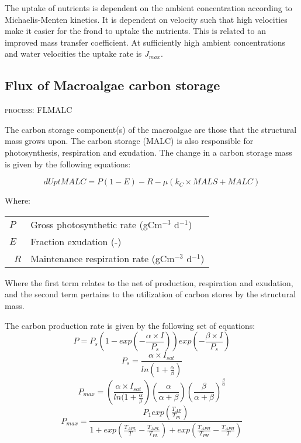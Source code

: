 \documentclass{deltares_manual}
\begin{document}
The uptake of nutrients is dependent on the ambient concentration according to Michaelis-Menten kinetics. It is dependent on velocity such that high velocities make it easier for the frond to uptake the nutrients. This is related to an improved mass transfer coefficient. At sufficiently high ambient concentrations and water velocities the uptake rate is $J_{max}$.

\subsection{Flux of Macroalgae carbon storage}
\begin{flushright}
\textsc{process: FLMALC}
\end{flushright}

The carbon storage component(s) of the macroalgae are those that the structural mass grows upon. The carbon storage (MALC) is also responsible for photosynthesis, respiration and exudation. The change in a carbon storage mass is given by the following equations:

\[dUptMALC = P(1-E)-R - \mu(k_C \times MALS + MALC)\]

Where:
\begin{tabular}{ll}
$P$ & Gross photosynthetic rate (gCm$^{-3}$ d$^{-1}$)\\
$E$ & Fraction exudation (-)\\\
$R$ & Maintenance respiration rate (gCm$^{-3}$ d$^{-1}$)\\
\end{tabular}

Where the first term relates to the net of production, respiration and exudation, and the second term pertains to the utilization of carbon stores by the structural mass.

The carbon production rate is given by the following set of equations:
\[P = P_s(1-exp(-\frac{\alpha \times I}{P_s}))exp(-\frac{\beta \times I}{P_s})\]
\[P_s = \frac{\alpha \times I_{sat}}{ln(1+\frac{\alpha}{\beta})}\]
\[P_{max} = (\frac{\alpha \times I_{sat}}{ln(1+\frac{\alpha}{\beta}})(\frac{\alpha}{\alpha+\beta})(\frac{\beta}{\alpha+\beta})^{\frac{\beta}{\alpha}}\]
\[P_{max} = \frac{P_1exp(\frac{T_{AP}}{T_{P1}})}{1+exp(\frac{T_{APL}}{T} - \frac{T_{APL}}{T_{PL}})+exp(\frac{T_{APH}}{T_{PH}}-\frac{T_{APH}}{T})}\]
\end{document}
